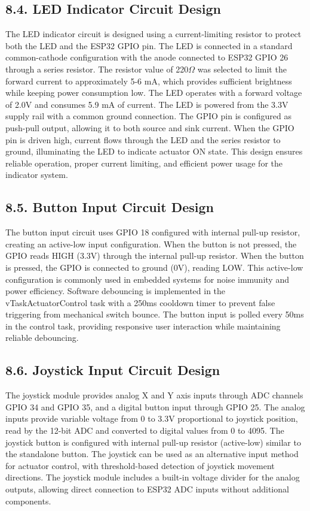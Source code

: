 \documentclass[12pt]{article}
\begin{document}
\subsection*{8.4. LED Indicator Circuit Design}

The LED indicator circuit is designed using a current-limiting resistor to protect both the LED and the ESP32 GPIO pin. The LED is connected in a standard common-cathode configuration with the anode connected to ESP32 GPIO 26 through a series resistor. The resistor value of 220$\Omega$ was selected to limit the forward current to approximately 5-6 mA, which provides sufficient brightness while keeping power consumption low. The LED operates with a forward voltage of 2.0V and consumes 5.9 mA of current. The LED is powered from the 3.3V supply rail with a common ground connection. The GPIO pin is configured as push-pull output, allowing it to both source and sink current. When the GPIO pin is driven high, current flows through the LED and the series resistor to ground, illuminating the LED to indicate actuator ON state. This design ensures reliable operation, proper current limiting, and efficient power usage for the indicator system.

\subsection*{8.5. Button Input Circuit Design}

The button input circuit uses GPIO 18 configured with internal pull-up resistor, creating an active-low input configuration. When the button is not pressed, the GPIO reads HIGH (3.3V) through the internal pull-up resistor. When the button is pressed, the GPIO is connected to ground (0V), reading LOW. This active-low configuration is commonly used in embedded systems for noise immunity and power efficiency. Software debouncing is implemented in the vTaskActuatorControl task with a 250ms cooldown timer to prevent false triggering from mechanical switch bounce. The button input is polled every 50ms in the control task, providing responsive user interaction while maintaining reliable debouncing.

\subsection*{8.6. Joystick Input Circuit Design}

The joystick module provides analog X and Y axis inputs through ADC channels GPIO 34 and GPIO 35, and a digital button input through GPIO 25. The analog inputs provide variable voltage from 0 to 3.3V proportional to joystick position, read by the 12-bit ADC and converted to digital values from 0 to 4095. The joystick button is configured with internal pull-up resistor (active-low) similar to the standalone button. The joystick can be used as an alternative input method for actuator control, with threshold-based detection of joystick movement directions. The joystick module includes a built-in voltage divider for the analog outputs, allowing direct connection to ESP32 ADC inputs without additional components.
\end{document}
